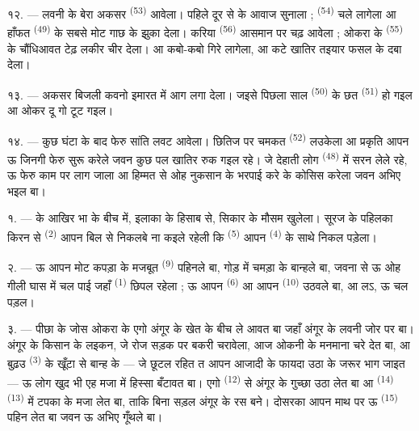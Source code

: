 \VUsaut{5.0mm}
\VUsaut{3.4mm}

१२. --- लवनी के बेरा अकसर  \textsuperscript{(53)}
आवेला। पहिले दूर से  के आवाज सुनाला ; 
\textsuperscript{(54)} चले लागेला आ हाँफत  \textsuperscript{(49)}
के सबसे मोट गाछ के झुका देला। करिया  \textsuperscript{(56)}
आसमान पर चढ़ आवेला ; ओकरा के  \textsuperscript{(55)} के
चौंधिआवत टेढ़ लकीर चीर देला।  आ कबो-कबो  गिरे
लागेला, आ कटे खातिर तइयार फसल के दबा देला।

१३. --- अकसर बिजली कवनो इमारत में आग लगा देला। जइसे पिछला साल
 \textsuperscript{(50)} के छत 
\textsuperscript{(51)} हो गइल आ ओकर दू गो  टूट गइल।

१४. --- कुछ घंटा के बाद फेरु सांति लवट आवेला। छितिज पर चमकत
 \textsuperscript{(52)} लउकेला आ प्रकृति आपन ऊ जिनगी
फेरु सुरू करेले जवन कुछ पल खातिर रुक गइल रहे। जे देहाती लोग
 \textsuperscript{(48)} में सरन लेले रहे, ऊ फेरु काम पर लाग
जाला आ हिम्मत से ओह नुकसान के भरपाई करे के कोसिस करेला जवन अभिए भइल बा।

\VUsaut{6.0mm}
\VUsaut{3.6mm}

\VUsaut{1.4mm}
\VUsaut{4.0mm}

१. ---  के आखिर भा  के बीच में, इलाका के
हिसाब से, सिकार के मौसम खुलेला। सूरज के पहिलका किरन से
 \textsuperscript{(2)} आपन बिल से निकलबे ना कइले रहेली कि
 \textsuperscript{(5)} आपन  \textsuperscript{(4)}
के साथे निकल पड़ेला।

२. --- ऊ आपन मोट कपड़ा के मजबूत 
\textsuperscript{(9)} पहिनले बा, गोड़ में चमड़ा के  बान्हले
बा, जवना से ऊ ओह गीली घास में चल पाई जहाँ 
\textsuperscript{(1)} छिपल रहेला ; ऊ आपन  \textsuperscript{(6)}
आ आपन  \textsuperscript{(10)} उठवले बा, आ लऽ, ऊ चल
पड़ल।

३. --- पीछा के जोस ओकरा के एगो अंगूर के खेत के बीच ले आवत बा जहाँ
अंगूर के लवनी जोर पर बा। अंगूर के किसान के लइकन, जे रोज सड़क पर बकरी
चरावेला, आज ओकनी के मनमाना चरे देत बा, आ बुढ़उ 
\textsuperscript{(3)} के खूँटा से बान्ह के — जे छूटल रहित त आपन आजादी के
फायदा उठा के जरूर भाग जाइत — ऊ लोग खुद भी एह मजा में हिस्सा बँटावत बा।
एगो  \textsuperscript{(12)} से अंगूर के गुच्छा उठा
लेत बा आ  \textsuperscript{(14)} 
\textsuperscript{(13)} में टपका के मजा लेत बा, ताकि बिना सड़ल अंगूर के रस
बने। दोसरका आपन माथ पर ऊ  \textsuperscript{(15)}
पहिन लेत बा जवन ऊ अभिए गूँथले बा।

